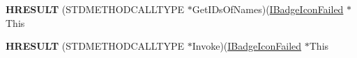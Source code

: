 \begin{DoxyCompactItemize}
\item 
\hypertarget{struct_i_badge_icon_failed_vtbl_ab4622e144ae1a7d0b1b6b41c90b4093e}{{\bfseries H\-R\-E\-S\-U\-L\-T} (S\-T\-D\-M\-E\-T\-H\-O\-D\-C\-A\-L\-L\-T\-Y\-P\-E $\ast$Get\-I\-Ds\-Of\-Names)(\hyperlink{interface_i_badge_icon_failed}{I\-Badge\-Icon\-Failed} $\ast$This}\label{struct_i_badge_icon_failed_vtbl_ab4622e144ae1a7d0b1b6b41c90b4093e}

\item 
\hypertarget{struct_i_badge_icon_failed_vtbl_a31add0b38a8afb3d7235bf2296e00675}{{\bfseries H\-R\-E\-S\-U\-L\-T} (S\-T\-D\-M\-E\-T\-H\-O\-D\-C\-A\-L\-L\-T\-Y\-P\-E $\ast$Invoke)(\hyperlink{interface_i_badge_icon_failed}{I\-Badge\-Icon\-Failed} $\ast$This}\label{struct_i_badge_icon_failed_vtbl_a31add0b38a8afb3d7235bf2296e00675}

\end{DoxyCompactItemize}

